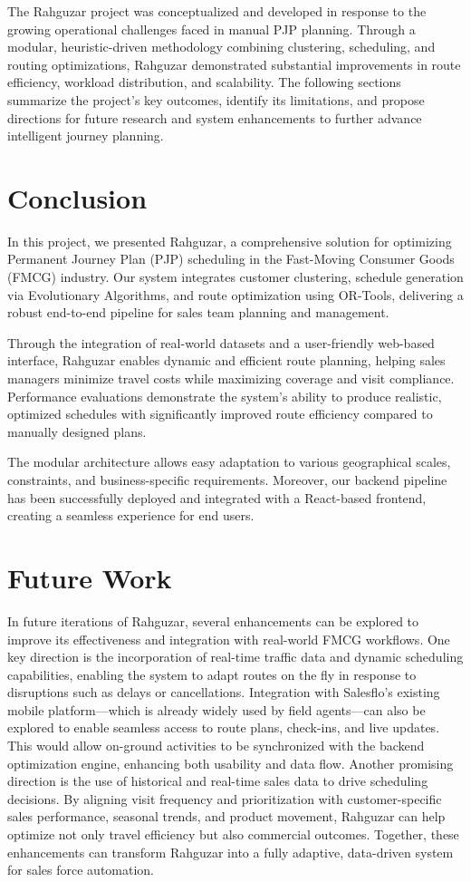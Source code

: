 The Rahguzar project was conceptualized and developed in response to the growing operational challenges faced in manual PJP planning. Through a modular, heuristic-driven methodology combining clustering, scheduling, and routing optimizations, Rahguzar demonstrated substantial improvements in route efficiency, workload distribution, and scalability. The following sections summarize the project’s key outcomes, identify its limitations, and propose directions for future research and system enhancements to further advance intelligent journey planning.

\section{Conclusion}
In this project, we presented Rahguzar, a comprehensive solution for optimizing Permanent Journey Plan (PJP) scheduling in the Fast-Moving Consumer Goods (FMCG) industry. Our system integrates customer clustering, schedule generation via Evolutionary Algorithms, and route optimization using OR-Tools, delivering a robust end-to-end pipeline for sales team planning and management.

Through the integration of real-world datasets and a user-friendly web-based interface, Rahguzar enables dynamic and efficient route planning, helping sales managers minimize travel costs while maximizing coverage and visit compliance. Performance evaluations demonstrate the system’s ability to produce realistic, optimized schedules with significantly improved route efficiency compared to manually designed plans.

The modular architecture allows easy adaptation to various geographical scales, constraints, and business-specific requirements. Moreover, our backend pipeline has been successfully deployed and integrated with a React-based frontend, creating a seamless experience for end users.
\section{Future Work}
In future iterations of Rahguzar, several enhancements can be explored to improve its effectiveness and integration with real-world FMCG workflows. One key direction is the incorporation of real-time traffic data and dynamic scheduling capabilities, enabling the system to adapt routes on the fly in response to disruptions such as delays or cancellations. Integration with Salesflo’s existing mobile platform—which is already widely used by field agents—can also be explored to enable seamless access to route plans, check-ins, and live updates. This would allow on-ground activities to be synchronized with the backend optimization engine, enhancing both usability and data flow. Another promising direction is the use of historical and real-time sales data to drive scheduling decisions. By aligning visit frequency and prioritization with customer-specific sales performance, seasonal trends, and product movement, Rahguzar can help optimize not only travel efficiency but also commercial outcomes. Together, these enhancements can transform Rahguzar into a fully adaptive, data-driven system for sales force automation.
